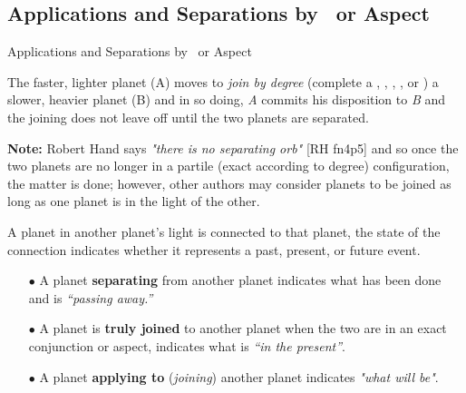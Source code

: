 \subsection{Applications and Separations by \Conjunction\ or Aspect}

\begin{frame}[t]{Applications and Separations by \Conjunction\ or Aspect}
\begin{block}{}
The faster, lighter planet (A) moves to \textsl{join by degree} (complete a \Conjunction, \Sextile, \Square, \Trine, or \Opposition) a slower, heavier planet (B) and in so doing, \textsl{A} commits his disposition to \textsl{B} and the joining does not leave off until the two planets are separated.
\end{block}

\begin{mdframed}[backgroundcolor=gray!5, rightmargin=2em, leftmargin=2em]
\small
\textbf{Note:} Robert Hand says \textsl{"there is no separating orb"} [RH fn4p5] and so once the two planets are no longer in a partile (exact according to degree) configuration, the matter is done; however, other authors may consider planets to be joined as long as one planet is in the light of the other.\footnotemark[1]
\end{mdframed}

A planet in another planet's light is connected to that planet, the state of the connection indicates whether it represents a past, present, or future event.\\
\begin{itemize}
\footnotesize
\item[$\bullet$] A planet \textbf{separating} from another planet indicates what has been done and is \textsl{``passing away.''}\\

\item[$\bullet$] A planet is \textbf{truly joined} to another planet when the two are in an exact conjunction or aspect, indicates what is \textsl{``in the present''}.\\

\item[$\bullet$] A planet \textbf{applying to} (\textsl{joining}) another planet  indicates \textsl{"what will be"}. \\
\end{itemize}


\end{frame}